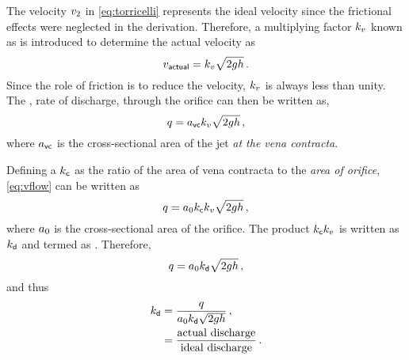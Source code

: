 The velocity $v_2$ in \cref{eq:torricelli} represents the ideal velocity since the frictional effects were neglected in the derivation. Therefore, a multiplying factor $k_v$ known as  is introduced to determine the actual velocity as
%
\begin{equation*}
  v_{\text{\sffamily actual}} = k_v\sqrt{2gh}\,.
\end{equation*}
%
Since the role of friction is to reduce the velocity, $k_v$ is always less than unity. The , \aka rate of discharge, through the orifice can then be written as,
%
~
%
\begin{equation}\label{eq:vflow}
  q = a_{\text{\sffamily vc}}k_v\sqrt{2gh}\,,
\end{equation}
%
where $a_{\text{\sffamily vc}}$ is the cross-sectional area of the jet \emph{at the vena contracta}.

Defining a  $k_{\text{\sffamily c}}$ as the ratio of the area of vena contracta to the \emph{area of orifice}, \cref{eq:vflow} can be written as
%
\begin{equation*}
  q = a_0k_{\text{\sffamily c}}k_v\sqrt{2gh}\,,
\end{equation*}
%
where $a_0$ is the cross-sectional area of the orifice. The product $k_{\text{\sffamily c}}k_v$ is written as $k_{\text{\sffamily d}}$ and termed as . Therefore,
%
\begin{equation*}
  q = a_0k_{\text{\sffamily d}}\sqrt{2gh}\,,
\end{equation*}
%
and thus
%
\begin{align*}
  k_{\text{\sffamily d}} &= \dfrac{q}{a_0k_{\text{\sffamily d}}\sqrt{2gh}}\,,\\
         &= \dfrac{\text{actual discharge}}{\text{ideal discharge}}\,.
\end{align*}
